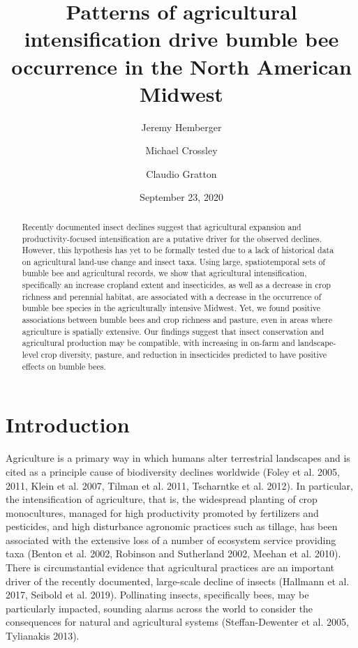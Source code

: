 \documentclass[11pt,]{article}
\title{\textbf{Patterns of agricultural intensification drive bumble bee
occurrence in the North American Midwest}}
\author{Jeremy Hemberger \and Michael Crossley \and Claudio Gratton}
\date{September 23, 2020}
\begin{document}
\maketitle
\begin{abstract}
Recently documented insect declines suggest that agricultural expansion
and productivity-focused intensification are a putative driver for the
observed declines. However, this hypothesis has yet to be formally
tested due to a lack of historical data on agricultural land-use change
and insect taxa. Using large, spatiotemporal sets of bumble bee and
agricultural records, we show that agricultural intensification,
specifically an increase cropland extent and insecticides, as well as a
decrease in crop richness and perennial habitat, are associated with a
decrease in the occurrence of bumble bee species in the agriculturally
intensive Midwest. Yet, we found positive associations between bumble
bees and crop richness and pasture, even in areas where agriculture is
spatially extensive. Our findings suggest that insect conservation and
agricultural production may be compatible, with increasing in on-farm
and landscape-level crop diversity, pasture, and reduction in
insecticides predicted to have positive effects on bumble bees.
\end{abstract}

\captionsetup[table]{labelformat=empty}

\hypertarget{introduction}{%
\section{Introduction}\label{introduction}}

Agriculture is a primary way in which humans alter terrestrial
landscapes and is cited as a principle cause of biodiversity declines
worldwide (Foley et al. 2005, 2011, Klein et al. 2007, Tilman et al.
2011, Tscharntke et al. 2012). In particular, the intensification of
agriculture, that is, the widespread planting of crop monocultures,
managed for high productivity promoted by fertilizers and pesticides,
and high disturbance agronomic practices such as tillage, has been
associated with the extensive loss of a number of ecosystem service
providing taxa (Benton et al. 2002, Robinson and Sutherland 2002, Meehan
et al. 2010). There is circumstantial evidence that agricultural
practices are an important driver of the recently documented,
large-scale decline of insects (Hallmann et al. 2017, Seibold et al.
2019). Pollinating insects, specifically bees, may be particularly
impacted, sounding alarms across the world to consider the consequences
for natural and agricultural systems (Steffan-Dewenter et al. 2005,
Tylianakis 2013).
\end{document}
